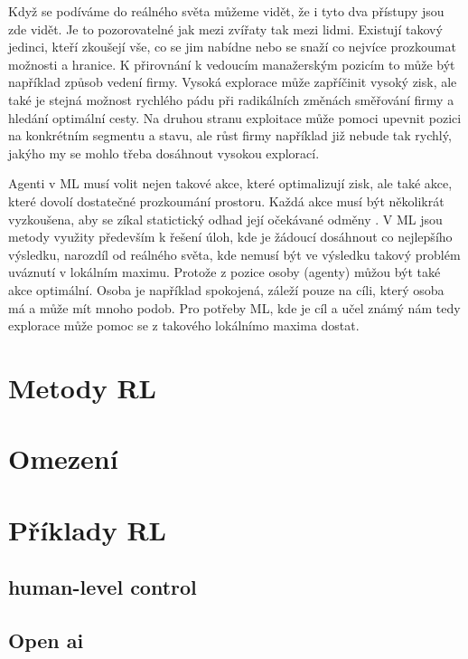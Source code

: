 \documentclass{article}
\begin{document}
Když se podíváme do reálného světa můžeme vidět, že i tyto dva přístupy jsou zde vidět. Je to pozorovatelné jak mezi zvířaty tak mezi lidmi. Existují takový jedinci, kteří zkoušejí vše, co se jim nabídne nebo se snaží co nejvíce prozkoumat možnosti a hranice. K přirovnání k vedoucím manažerským pozicím to může být například způsob vedení firmy. Vysoká explorace může zapříčinit vysoký zisk, ale také je stejná možnost rychlého pádu při radikálních změnách směřování firmy a hledání optimální cesty. Na druhou stranu exploitace může pomoci upevnit pozici na konkrétním segmentu a stavu, ale růst firmy například již nebude tak rychlý, jakýho my se mohlo třeba dosáhnout vysokou explorací.

Agenti v ML musí volit nejen takové akce, které optimalizují zisk, ale také akce, které dovolí dostatečné prozkoumání prostoru. Každá akce musí být několikrát vyzkoušena, aby se zíkal statictický odhad její očekávané odměny \cite{sutton1998introduction}. V ML jsou metody využity především k řešení úloh, kde je žádoucí dosáhnout co nejlepšího výsledku, narozdíl od reálného světa, kde nemusí být ve výsledku takový problém uváznutí v lokálním maximu. Protože z pozice osoby (agenty) můžou být také akce optimální. Osoba je například spokojená, záleží pouze na cíli, který osoba má a může mít mnoho podob. Pro potřeby ML, kde je cíl a učel známý nám tedy explorace může pomoc se z takového lokálnímo maxima dostat. 


\section{Metody RL}


\section{Omezení}

\section{Příklady RL}
\label{sec:priklady}

\subsection{human-level control}
\cite{mnih2015human}
\subsection{Open ai}
\cite{openAI}
\cite{baker2019emergent}
\end{document}
